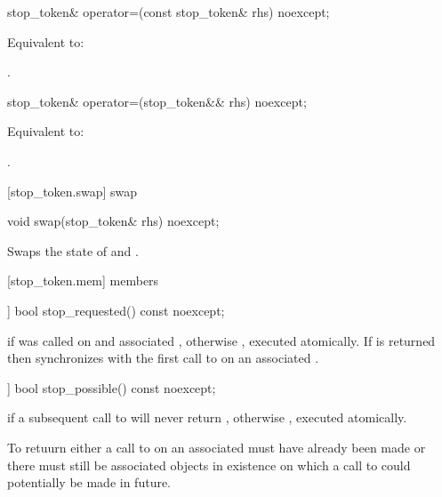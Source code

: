 {%
\begin{itemdecl}
stop_token& operator=(const stop_token& rhs) noexcept;
\end{itemdecl}
\begin{itemdescr}
  \pnum\effects Equivalent to: 

  \pnum\returns {}.
\end{itemdescr}

%
\begin{itemdecl}
stop_token& operator=(stop_token&& rhs) noexcept;
\end{itemdecl}
\begin{itemdescr}
  \pnum\effects Equivalent to: 

  \pnum\returns {}.
\end{itemdescr}

[stop_token.swap]{ swap}

%
\begin{itemdecl}
void swap(stop_token& rhs) noexcept;
\end{itemdecl}

\begin{itemdescr}
\pnum
\effects Swaps the state of  and .
\end{itemdescr}


[stop_token.mem]{ members}

%
\begin{itemdecl}
[[nodiscard]] bool stop_requested() const noexcept;
\end{itemdecl}
\begin{itemdescr}
  \pnum\returns {} if  was called on and
                associated , otherwise , executed atomically.
  \pnum\sync If  is returned then synchronizes with the
             first call to  on an associated
             .
\end{itemdescr}

%
\begin{itemdecl}
[[nodiscard]] bool stop_possible() const noexcept;
\end{itemdecl}
\begin{itemdescr}
  \pnum\returns {} if a subsequent call to  will never return ,
                otherwise , executed atomically.
                \begin{note}To retuurn  either a call to 
                  on an associated  must have already been made or there
                  must still be associated  objects in existence on which
                  a call to  could potentially be made in future.
                \end{note}
\end{itemdescr}


}
